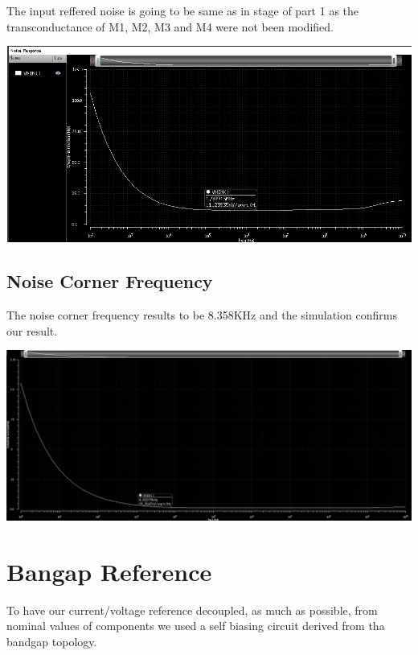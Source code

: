 The input reffered noise is going to be same as in stage of part 1 as the transconductance of M1, M2, M3 and M4 were not been modified.

\centering
\includegraphics[width=1\textwidth]{Capitoli/wn.png}
\raggedright


\subsection{Noise Corner Frequency} %
\label{sub:noise_corner_frequency}

The noise corner frequency results to be 8.358KHz and the simulation confirms our result.




\centering
\includegraphics[width=1\textwidth]{Capitoli/ncf.png}
\raggedright


\section{Bangap Reference}


To have our current/voltage reference decoupled, as much as possible, from nominal values of components we used a self biasing circuit derived from tha bandgap topology.


